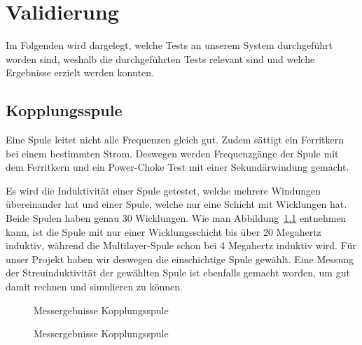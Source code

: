 \chapter{Validierung}
\label{chap:validierung}

Im Folgenden  wird dargelegt,  welche Tests  an unserem  System durchgef\"uhrt
worden  sind, weshalb  die  durchgef\"uhrten Tests  relevant  sind und  welche
Ergebnisse erzielt werden konnten.

\section{Kopplungsspule}
\label{sec:val:coupling:coil}

Eine  Spule  leitet nicht  alle  Frequenzen  gleich gut. Zudem  s\"attigt  ein
Ferritkern  bei einem  bestimmten Strom. Deswegen  werden Frequenzg\"ange  der
Spule mit dem Ferritkern und  ein Power-Choke Test mit einer Sekund\"arwindung
gemacht.

Es   wird   die   Induktivit\"at   einer  Spule   getestet,   welche   mehrere
Windungen  \"ubereinander  hat  und  einer  Spule,  welche  nur  eine  Schicht
mit  Wicklungen   hat. Beide  Spulen   haben  genau  30   Wicklungen. Wie  man
Abbildung~\ref{fig:meas:coupling:coil:L} entnehmen kann, ist die Spule mit nur
einer  Wicklungsschicht  bis  \"uber  20  Megahertz  induktiv,  w\"ahrend  die
Multilayer-Spule  schon bei  4  Megahertz induktiv  wird. F\"ur unser  Projekt
haben  wir  deswegen  die  einschichtige  Spule  gew\"ahlt. Eine  Messung  der
Streuinduktivit\"at der gew\"ahlten Spule ist ebenfalls gemacht worden, um gut
damit rechnen und simulieren zu k\"onnen.

\begin{figure}[h!tb]
    \centering
    
    \caption[Messresultate Kopplungsspule]{Messergebnisse Kopplungsspule}
    \label{fig:meas:coupling:coil:L}
\end{figure}

\begin{figure}[h!tb]
    \centering
    
    \caption[Messresultate Kopplungsspule]{Messergebnisse Kopplungsspule}
    \label{fig:meas:coupling:coil:R}
\end{figure}

